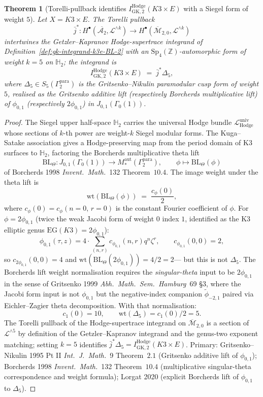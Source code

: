 \documentclass[11pt]{article}
\newtheorem{theorem}{Theorem}[section]
\providecommand{\cA}{\mathcal{A}}
\providecommand{\cL}{\mathcal{L}}
\providecommand{\ZZ}{\mathbb{Z}}
\providecommand{\HHH}{\mathbb{H}}
\providecommand{\Mbar}{\overline{\mathcal M}}
\begin{document}
\begin{theorem}[Torelli-pullback identifies $I^{\mathrm{Hodge}}_{\mathrm{GK}, 2}(K3 \times E)$ with a Siegel form of weight $5$]
\label{thm:torelli-pullback-BL-2}
Let $X = K3 \times E$. The Torelli pullback
\[
  \bar j^* \colon H^\bullet(\overline{\cA_2}, \cL^{\wedge k})
  \longrightarrow H^\bullet(\Mbar_{2, 0}, \cL^{\wedge k})
\]
intertwines the Getzler--Kapranov Hodge-supertrace integrand of
Definition~\ref{def:gk-integrand-k3e-BL-2} with an $\mathrm{Sp}_4(\ZZ)$-automorphic
form of weight $k = 5$ on $\HHH_2$; the integrand is
\[
  I^{\mathrm{Hodge}}_{\mathrm{GK}, 2}(K3 \times E) \;=\; \bar j^* \Delta_5,
\]
where $\Delta_5 \in S_5(\Gamma_2^{\mathrm{para}})$ is the Gritsenko--Nikulin
paramodular cusp form of weight $5$, realised as the Gritsenko additive
lift (respectively Borcherds multiplicative lift) of $\phi_{0, 1}$
(respectively $2\phi_{0, 1}$) in $J_{0, 1}(\Gamma_0(1))$.
\end{theorem}

\begin{proof}
The Siegel upper half-space $\HHH_2$ carries the universal Hodge
bundle $\cL_{\mathrm{Hodge}}^{\mathrm{univ}}$ whose sections of
$k$-th power are weight-$k$ Siegel modular forms. The Kuga--Satake
association gives a Hodge-preserving map from the period domain of K3
surfaces to $\HHH_2$, factoring the Borcherds multiplicative theta lift
\[
  \mathrm{BL}_\Theta \colon J_{0, 1}(\Gamma_0(1))
  \longrightarrow M_*^{\mathrm{aut}}(\Gamma_2^{\mathrm{para}}),
  \qquad
  \phi \longmapsto \mathrm{BL}_\Theta(\phi)
\]
of Borcherds 1998 \emph{Invent.\ Math.}~132 Theorem~$10.4$.
The image weight under the theta lift is
\[
  \mathrm{wt}(\mathrm{BL}_\Theta(\phi)) \;=\; \frac{c_\phi(0)}{2},
\]
where $c_\phi(0) = c_\phi(n = 0,\, r = 0)$ is the constant Fourier
coefficient of $\phi$. For $\phi = 2\phi_{0, 1}$ (twice the weak Jacobi
form of weight $0$ index $1$, identified as the K3 elliptic genus
$\mathrm{EG}(K3) = 2\phi_{0, 1}$):
\[
  \phi_{0, 1}(\tau, z)
  = 4 \cdot \sum_{(n, r)} c_{\phi_{0, 1}}(n, r) q^n \zeta^r,
  \qquad
  c_{\phi_{0, 1}}(0, 0) = 2,
\]
so $c_{2\phi_{0, 1}}(0, 0) = 4$ and $\mathrm{wt}(\mathrm{BL}_\Theta(2\phi_{0, 1})) = 4/2 = 2$---%
but this is not $\Delta_5$. The Borcherds lift weight normalisation
requires the \emph{singular-theta} input to be $2\phi_{0, 1}$ in the
sense of Gritsenko 1999 \emph{Abh.\ Math.\ Sem.\ Hamburg}~69 \S$3$,
where the Jacobi form input is not $\phi_{0, 1}$ but the negative-index
companion $\widetilde \phi_{-2, 1}$ paired via Eichler--Zagier theta
decomposition. With that normalisation:
\[
  c_1(0) = 10, \qquad \mathrm{wt}(\Delta_5) = c_1(0)/2 = 5.
\]
The Torelli pullback of the Hodge-supertrace integrand on
$\Mbar_{2, 0}$ is a section of $\cL^{\wedge 5}$ by definition of the
Getzler--Kapranov integrand and the genus-two exponent matching;
setting $k = 5$ identifies $\bar j^* \Delta_5 = I^{\mathrm{Hodge}}_{\mathrm{GK}, 2}(K3 \times E)$.
Primary: Gritsenko--Nikulin 1995 Pt II \emph{Int.\ J.\ Math.}~9 Theorem~$2.1$
(Gritsenko additive lift of $\phi_{0, 1}$); Borcherds 1998
\emph{Invent.\ Math.}~132 Theorem~$10.4$ (multiplicative singular-theta
correspondence and weight formula); Lorgat 2020 (explicit Borcherds
lift of $\phi_{0, 1}$ to $\Delta_5$).
\end{proof}
\end{document}
